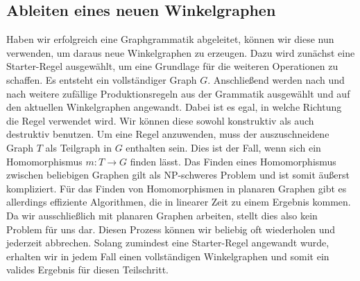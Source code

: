 \subsection{Ableiten eines neuen Winkelgraphen}
Haben wir erfolgreich eine Graphgrammatik abgeleitet, können wir diese nun verwenden, um daraus neue Winkelgraphen zu erzeugen. Dazu wird zunächst eine
Starter-Regel ausgewählt, um eine Grundlage für die weiteren Operationen zu schaffen. Es entsteht ein vollständiger Graph \(G\). Anschließend werden nach
und nach weitere zufällige Produktionsregeln aus der Grammatik ausgewählt und auf den aktuellen Winkelgraphen angewandt. Dabei ist es egal, in welche
Richtung die Regel verwendet wird. Wir können diese sowohl konstruktiv als auch destruktiv benutzen. Um eine Regel anzuwenden, muss der
auszuschneidene Graph \(T\) als Teilgraph in \(G\) enthalten sein. Dies ist der Fall, wenn sich ein Homomorphismus \(m: T \rightarrow G\) finden lässt.
Das Finden eines Homomorphismus zwischen beliebigen Graphen gilt als NP-schweres Problem und
ist somit äußerst kompliziert. \cite{34_cook} Für das Finden von Homomorphismen in planaren Graphen gibt es allerdings effiziente Algorithmen, die in linearer
Zeit zu einem Ergebnis kommen. \cite{8_eppstein} Da wir ausschließlich mit planaren Graphen arbeiten, stellt dies also kein Problem für uns dar. Diesen
Prozess können wir beliebig oft wiederholen und jederzeit abbrechen. Solang zumindest eine Starter-Regel angewandt wurde, erhalten wir in jedem Fall einen
vollständigen Winkelgraphen und somit ein valides Ergebnis für diesen Teilschritt.

